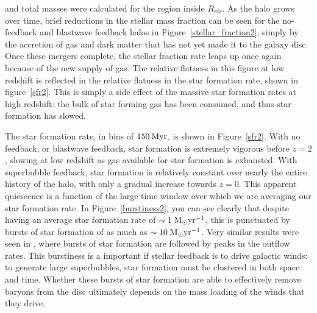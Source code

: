 and total masses were calculated for the region inside $R_{vir}$.  As the halo
grows over time, brief reductions in the stellar mass fraction can be seen for
the no-feedback and blastwave feedback halos in Figure~\ref{stellar_fraction2},
simply by the accretion of gas and dark matter that has not yet made it to the
galaxy disc.  Once these mergers complete, the stellar fraction rate leaps up
once again because of the new supply of gas.  The relative flatness in this
figure at low redshift is reflected in the relative flatness in the star
formation rate, shown in figure~\ref{sfr2}.  This is simply a side effect of the
massive star formation rates at high redshift:  the bulk of star forming gas has
been consumed, and thus star formation has slowed.

The star formation rate, in bins of $150\: \rm{Myr}$, is shown in
Figure~\ref{sfr2}.  With no feedback, or blastwave feedback, star formation is
extremely vigorous before $z=2$, slowing at low redshift as gas available for
star formation is exhausted.  With superbubble feedback, star formation is
relatively constant over nearly the entire history of the halo, with only a
gradual increase towards $z=0$.  This apparent quiescence is a function of the
large time window over which we are averaging our star formation rate.  In
Figure~\ref{burstiness2}, you can see clearly that despite having an average star
formation rate of $\sim1\; \rm{M_\odot yr^{-1}}$, this is punctuated by bursts
of star formation of as much as $\sim10\; \rm{M_\odot yr^{-1}}$.  Very similar
results were seen in \citet{Muratov2015}, where bursts of star formation are
followed by peaks in the outflow rates.  This burstiness is a important if
stellar feedback is to drive galactic winds:  to generate large superbubbles,
star formation must be clustered in both space and time.  Whether these bursts
of star formation are able to effectively remove baryons from the disc
ultimately depends on the mass loading of the winds that they drive.

